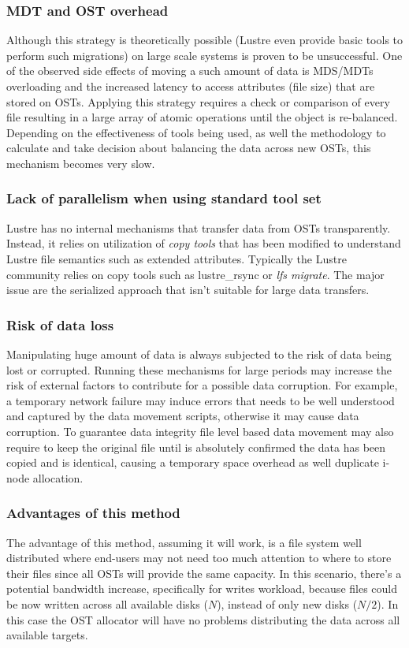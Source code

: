 \documentclass{article}
\begin{document}
\subsubsection{MDT and OST overhead}
Although this strategy is theoretically possible (Lustre even provide basic tools to perform such migrations) on large scale systems is proven to be unsuccessful. One of the observed side effects of moving a such amount of data is  MDS/MDTs overloading and the increased latency to access attributes (file size) that are stored on OSTs. Applying this strategy requires a check or comparison of every file resulting in a large array of atomic operations until the object is re-balanced. Depending on the effectiveness of tools being used, as well the methodology to calculate and take decision about balancing the data across new OSTs, this mechanism becomes very slow.

\subsubsection{Lack of parallelism when using standard tool set}
Lustre has no internal mechanisms that transfer data from OSTs transparently. Instead, it relies on utilization of \textit{copy tools} that has been modified to understand Lustre file semantics such as extended attributes. 
Typically the Lustre community relies on copy tools such as lustre\_rsync or \textit{lfs migrate}. The major issue are the serialized approach that isn't suitable for large data transfers.

\subsubsection{Risk of data loss}
Manipulating huge amount of data is always subjected to the risk of data being lost or corrupted. Running these mechanisms for large periods may increase the risk of external factors to contribute for a possible data corruption. For example, a temporary network failure may induce errors that needs to be well understood and captured by the data movement scripts, otherwise it may cause data corruption. To guarantee data integrity file level based data movement may also require to keep the original file until is absolutely confirmed the data has been copied and is identical, causing a temporary space overhead as well duplicate i-node allocation.

\subsubsection{Advantages of this method}
The advantage of this method, assuming it will work, is a file system well distributed where end-users may not need too much attention to where to store their files since all OSTs will provide the same capacity. 
In this scenario, there's a potential bandwidth increase, specifically for writes workload, because files could be now  written across all available disks ($N$), instead of only new disks ($N/2$). In this case the OST allocator will have no problems distributing the data across all available targets.
\end{document}
